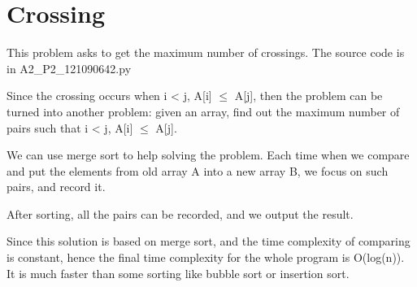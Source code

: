 
\section{Crossing}
This problem asks to get the maximum number of crossings. The source code is in A2\_P2\_121090642.py

Since the crossing occurs when i < j, A[i] $\leq$ A[j], then the problem can be turned into another problem: given an array, find out the maximum number of pairs such that i < j, A[i] $\leq$ A[j].

We can use merge sort to help solving the problem. Each time when we compare and put the elements from old array A into a new array B, we focus on such pairs, and record it.

After sorting, all the pairs can be recorded, and we output the result.

Since this solution is based on merge sort, and the time complexity of comparing is constant, hence the final time complexity for the whole program is O(log(n)). It is much faster than some sorting like bubble sort or insertion sort.
